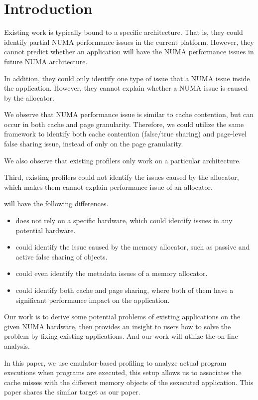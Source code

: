 \section{Introduction}
\label{sec:intro}

 Existing work is typically bound to a specific architecture. That is, they could identify partial NUMA performance issues in the current platform. However, they cannot predict whether an application will have the NUMA performance issues in future NUMA architecture. 
 
 In addition, they could only identify one type of issue that a NUMA issue inside the application. However, they cannot explain whether a NUMA issue is caused by the allocator. 
 
 We observe that NUMA performance issue is similar to cache contention, but can occur in both cache and page granularity. Therefore, we could utilize the same framework to identify both cache contention (false/true sharing) and page-level false sharing issue, instead of only on the page granularity. 
 
 We also observe that existing profilers only work on a particular architecture. 
 
 Third, existing profilers could not identify the issues caused by the allocator, which makes them cannot explain performance issue of an allocator. 
 
 
 \NP{} will have the following differences. 
 \begin{itemize}
 \item \NP{} does not rely on a specific hardware, which could identify issues in any potential hardware. 
 \item \NP{} could identify the issue caused by the memory allocator, such as passive and active false sharing of objects. 
 \item \NP{} could even identify the metadata issues of a memory allocator. 
 \item \NP{} could identify both cache and page sharing, where both of them have a significant performance impact on the application. 
 \end{itemize}

 


Our work is to derive some potential problems of existing applications on the given NUMA hardware, then provides an insight to users how to solve the problem by fixing existing applications. And our work will utilize the on-line analysis. 

In this paper, we use emulator-based profiling to analyze actual program executions when programs are executed, this setup allows us to associates the cache misses with the different memory objects of the sexecuted application. 
This paper shares the similar target as our paper. 

